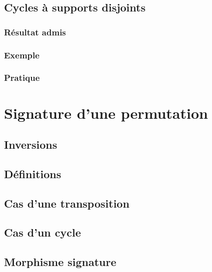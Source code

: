 \documentclass[12pt,a4paper,french]{book}
\begin{document}
		\subsection{Cycles à supports disjoints}
			\subsubsection{Résultat admis}
			\subsubsection{Exemple}
			\subsubsection{Pratique}
	\section{Signature d'une permutation}
		\subsection{Inversions}
		\subsection{Définitions}
		\subsection{Cas d'une transposition}
		\subsection{Cas d'un cycle}
		\subsection{Morphisme signature}
			
\end{document}

